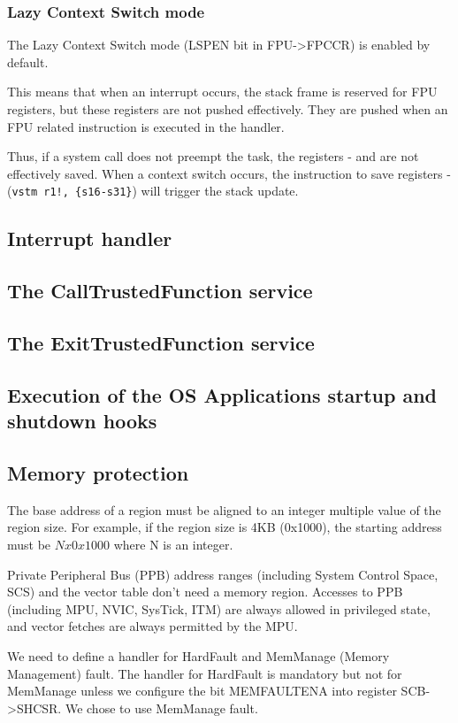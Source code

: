 \subsubsection{Lazy Context Switch mode}
The Lazy Context Switch mode (LSPEN bit in FPU->FPCCR) is enabled by default. 

This means that when an interrupt occurs, the stack frame is reserved for FPU registers, but these registers are not pushed effectively. They are pushed when an FPU related instruction is executed in the handler.

Thus, if a system call does not preempt the task, the registers - and  are not effectively saved. When a context switch occurs, the instruction to save registers - (\lstinline|vstm r1!, {s16-s31}|) will trigger the stack update.

\subsection{Interrupt handler}

\subsection{The CallTrustedFunction service}
\subsection{The ExitTrustedFunction service}
\subsection{Execution of the OS Applications startup and shutdown hooks}
\subsection{Memory protection}

The base address of a region must be aligned to an integer multiple value of the region size.
For example, if the region size is 4KB (0x1000), the starting address must be $N x 0x1000$ where N is an integer.

Private Peripheral Bus (PPB) address ranges (including System Control Space, SCS) and the vector table don't need a memory region.
Accesses to PPB (including MPU, NVIC, SysTick, ITM) are always allowed in privileged state, and vector fetches are always permitted by the MPU.

We need to define a handler for HardFault and MemManage (Memory Management) fault. The handler for HardFault is mandatory but not for MemManage unless we configure the bit MEMFAULTENA into register SCB->SHCSR.
We chose to use MemManage fault.

